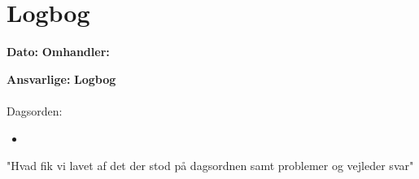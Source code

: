 \section{Logbog}

\textbf{Dato:} 
\textbf{Omhandler:} 

\textbf{Ansvarlige:} 
\textbf{Logbog}
\\
\\
Dagsorden:
\begin{itemize}
	\item 
\end{itemize}


"Hvad fik vi lavet af det der stod på dagsordnen samt problemer og vejleder svar"